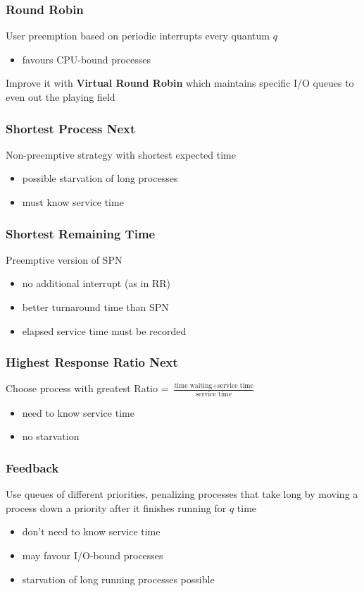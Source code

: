 \documentclass[]{article}
\theoremstyle{definition}
\begin{document}
	\subsubsection{Round Robin}
	User preemption based on periodic interrupts every quantum $q$
	\begin{itemize}
		\item favours CPU-bound processes
	\end{itemize}
	Improve it with \textbf{Virtual Round Robin} which maintains specific I/O queues
	to even out the playing field

	\subsubsection{Shortest Process Next}
	Non-preemptive strategy with shortest expected time
	\begin{itemize}
		\item possible starvation of long processes
		\item must know service time
	\end{itemize}

	\subsubsection{Shortest Remaining Time}
	Preemptive version of SPN 
	\begin{itemize}
		\item no additional interrupt (as in RR)
		\item better turnaround time than SPN
		\item elapsed service time must be recorded
	\end{itemize}

	\subsubsection{Highest Response Ratio Next}
	Choose process with greatest Ratio = $\frac{\text{time waiting} + \text{service time}}{\text{service time}}$
	\begin{itemize}
		\item need to know service time
		\item no starvation
	\end{itemize}

	\subsubsection{Feedback}
	Use queues of different priorities, penalizing processes that take long
	by moving a process down a priority after it finishes running for $q$ time
	\begin{itemize}
		\item don't need to know service time
		\item may favour I/O-bound processes
		\item starvation of long running processes possible
	\end{itemize}
\end{document}

